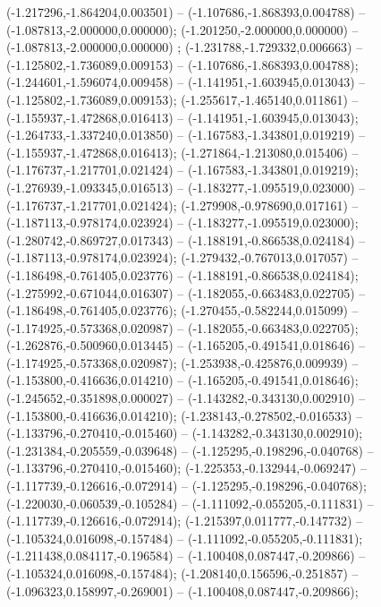  (-1.217296,-1.864204,0.003501) -- (-1.107686,-1.868393,0.004788) -- (-1.087813,-2.000000,0.000000);
 (-1.201250,-2.000000,0.000000) -- (-1.087813,-2.000000,0.000000) ;
 (-1.231788,-1.729332,0.006663) -- (-1.125802,-1.736089,0.009153) -- (-1.107686,-1.868393,0.004788);
 (-1.244601,-1.596074,0.009458) -- (-1.141951,-1.603945,0.013043) -- (-1.125802,-1.736089,0.009153);
 (-1.255617,-1.465140,0.011861) -- (-1.155937,-1.472868,0.016413) -- (-1.141951,-1.603945,0.013043);
 (-1.264733,-1.337240,0.013850) -- (-1.167583,-1.343801,0.019219) -- (-1.155937,-1.472868,0.016413);
 (-1.271864,-1.213080,0.015406) -- (-1.176737,-1.217701,0.021424) -- (-1.167583,-1.343801,0.019219);
 (-1.276939,-1.093345,0.016513) -- (-1.183277,-1.095519,0.023000) -- (-1.176737,-1.217701,0.021424);
 (-1.279908,-0.978690,0.017161) -- (-1.187113,-0.978174,0.023924) -- (-1.183277,-1.095519,0.023000);
 (-1.280742,-0.869727,0.017343) -- (-1.188191,-0.866538,0.024184) -- (-1.187113,-0.978174,0.023924);
 (-1.279432,-0.767013,0.017057) -- (-1.186498,-0.761405,0.023776) -- (-1.188191,-0.866538,0.024184);
 (-1.275992,-0.671044,0.016307) -- (-1.182055,-0.663483,0.022705) -- (-1.186498,-0.761405,0.023776);
 (-1.270455,-0.582244,0.015099) -- (-1.174925,-0.573368,0.020987) -- (-1.182055,-0.663483,0.022705);
 (-1.262876,-0.500960,0.013445) -- (-1.165205,-0.491541,0.018646) -- (-1.174925,-0.573368,0.020987);
 (-1.253938,-0.425876,0.009939) -- (-1.153800,-0.416636,0.014210) -- (-1.165205,-0.491541,0.018646);
 (-1.245652,-0.351898,0.000027) -- (-1.143282,-0.343130,0.002910) -- (-1.153800,-0.416636,0.014210);
 (-1.238143,-0.278502,-0.016533) -- (-1.133796,-0.270410,-0.015460) -- (-1.143282,-0.343130,0.002910);
 (-1.231384,-0.205559,-0.039648) -- (-1.125295,-0.198296,-0.040768) -- (-1.133796,-0.270410,-0.015460);
 (-1.225353,-0.132944,-0.069247) -- (-1.117739,-0.126616,-0.072914) -- (-1.125295,-0.198296,-0.040768);
 (-1.220030,-0.060539,-0.105284) -- (-1.111092,-0.055205,-0.111831) -- (-1.117739,-0.126616,-0.072914);
 (-1.215397,0.011777,-0.147732) -- (-1.105324,0.016098,-0.157484) -- (-1.111092,-0.055205,-0.111831);
 (-1.211438,0.084117,-0.196584) -- (-1.100408,0.087447,-0.209866) -- (-1.105324,0.016098,-0.157484);
 (-1.208140,0.156596,-0.251857) -- (-1.096323,0.158997,-0.269001) -- (-1.100408,0.087447,-0.209866);
